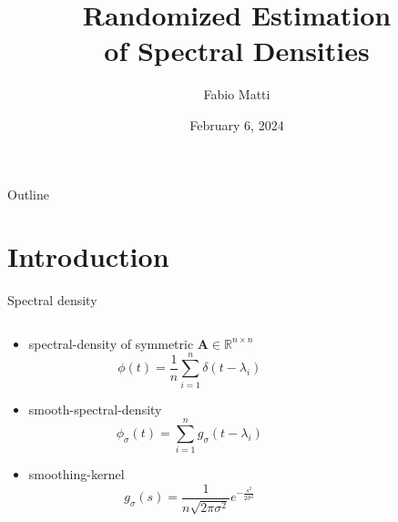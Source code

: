 \documentclass[aspectratio=169, leqno, 12pt]{beamer}
\title{Randomized Estimation \\ of Spectral Densities}
\date{February 6, 2024}
\author{Fabio Matti}
\newcommand{\mtx}[1]{\boldsymbol{#1}}
\begin{document}
\begin{frame}[noframenumbering]

    \titlepage

\end{frame}

\begin{frame}{Outline}

    \tableofcontents

    \begin{centering}
        
    \end{centering}
\end{frame}

\section{Introduction}

\begin{frame}{Spectral density}
    \begin{columns}
        \begin{column}{0.7\textwidth}
            \begin{itemize}
                \item \Gls{spectral-density} of symmetric $\mtx{A} \in \mathbb{R}^{n \times n}$
                \begin{equation}
                    \phi(t) = \frac{1}{n} \sum_{i=1}^n \delta(t - \lambda_i)
                \end{equation}
                \item \Gls{smooth-spectral-density}
                \begin{equation}
                    \phi_{\sigma}(t) = \sum_{i=1}^n g_{\sigma}(t - \lambda_i)
                \end{equation}
                \item \Gls{smoothing-kernel}
                \begin{equation}
                    g_{\sigma}(s) = \frac{1}{n \sqrt{2 \pi \sigma^2}} e^{-\frac{s^2}{2\sigma^2}}
                \end{equation}
            \end{itemize}
        \end{column}
        \begin{column}{0.3\textwidth}
            \centering
        \end{column}
    \end{columns}
\end{frame}
\end{document}

